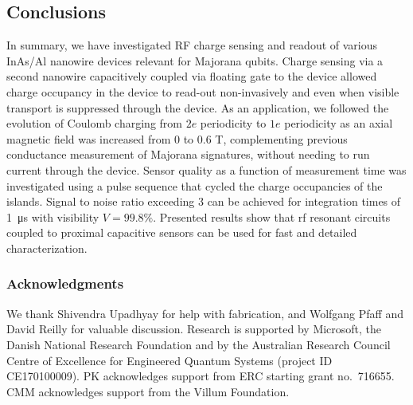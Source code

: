 \subsection{Conclusions}

In summary, we have investigated RF charge sensing and readout of various InAs/Al nanowire devices relevant for Majorana qubits. Charge sensing via a second nanowire capacitively coupled via floating gate to the device allowed charge occupancy in the device to read-out non-invasively and even when visible transport is suppressed through the device. As an application, we followed the evolution of Coulomb charging from $2e$ periodicity to $1e$ periodicity as an axial magnetic field was increased from 0 to 0.6 T, complementing previous conductance measurement of Majorana signatures, without needing to run current through the device. Sensor quality as a function of measurement time was investigated using a pulse sequence that cycled the charge occupancies of the islands. Signal to noise ratio exceeding 3 can be achieved for integration times of \SI{1}{\micro\second} with visibility $V = 99.8\%$. Presented results show that rf resonant circuits coupled to proximal capacitive sensors can be used for fast and detailed characterization.

\clearpage

\subsubsection{Acknowledgments}
We thank Shivendra Upadhyay for help with fabrication, and Wolfgang Pfaff and David Reilly for valuable discussion. Research is supported by Microsoft, the Danish National Research Foundation and by the Australian Research Council Centre of Excellence for Engineered Quantum Systems (project ID CE170100009). PK acknowledges support from ERC starting grant no.~716655. CMM acknowledges support from the Villum Foundation.

